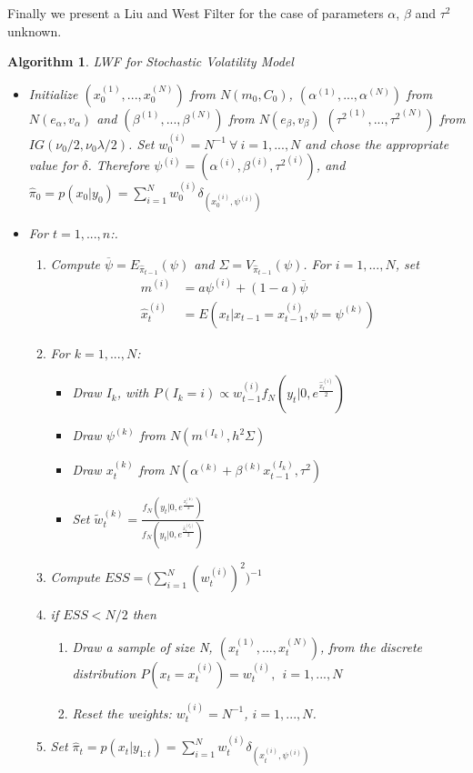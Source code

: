 \documentclass[
]{book}
\theoremstyle{break}
\theoremstyle{nonumberplain}
\newtheorem{algorithm}{Algorithm}[section]
\begin{document}
Finally we present a Liu and West Filter for the case of parameters
\(\alpha\), \(\beta\) and \(\tau^{2}\) unknown.

\begin{algorithm} LWF for Stochastic Volatility Model
\begin{itemize}
\item Initialize $(x_{0}^{(1)},...,x_{0}^{(N)})$ from $N(m_{0},C_{0})$, $(\alpha^{(1)},...,\alpha^{(N)})$ from $N(e_{\alpha},v_\alpha)$ and
$(\beta^{(1)},...,\beta^{(N)})$ from $N(e_{\beta},v_\beta)$ $({\tau^{2}}^{(1)},...,{\tau^{2}}^{(N)})$ from $IG(\nu_{0}/2,\nu_{0}\lambda/2)$. Set $w_{0}^{(i)}=N^{-1} \ \forall \ i=1,...,N$ and chose the appropriate value for $\delta$. Therefore $\psi^{(i)}=({\alpha}^{(i)},{\beta}^{(i)},{\tau^{2}}^{(i)})$, and
$\hat{\pi}_{0}=p(x_{0}|y_{0})=\sum_{i=1}^{N}w_{0}^{(i)}\delta_{(x_{0}^{(i)},\psi^{(i)})}$
\item For $t=1,...,n$:.
\begin{enumerate}
\item Compute $\overline{\psi}=E_{\hat{\pi}_{t-1}}(\psi)$ and $\Sigma=V_{\hat{\pi}_{t-1}}(\psi)$. For $i=1,...,N$, set
\begin{align*}
m^{(i)} & = a\psi^{(i)}+(1-a)\overline{\psi} \\
\hat{x}_{t}^{(i)} & = E(x_{t}|x_{t-1}=x_{t-1}^{(i)},\psi=\psi^{(k)})
\end{align*}
\item For $k=1,...,N$:
\begin{itemize}
\item Draw $I_{k}$, with $P(I_{k}=i) \propto w_{t-1}^{(i)}f_{N}(y_{t}|0,e^{\frac{\hat{x}_{t}^{(i)}}{2}}) $
\item Draw $\psi^{(k)}$ from $N(m^{(I_{k})},h^{2}\Sigma)$
\item Draw $x_{t}^{(k)}$ from $N(\alpha^{(k)}+\beta^{(k)}x_{t-1}^{(I_{k})},\tau^{2})$
\item Set  $\tilde{w}_{t}^{(k)} = \frac{f_{N}(y_{t}|0,e^{\frac{x_{t}^{(k)}}{2}})}{f_{N}(y_{t}|0,e^{\frac{\hat{x}_{t}^{(I_{k})}}{2}})}$
\end{itemize}
\item Compute $ESS=\Bigg(\sum_{i=1}^{N}(w_{t}^{(i)})^{2}\Bigg)^{-1}$
\item if $ESS<N/2$ then
\begin{enumerate}
\item Draw a sample of size N, $(x_{t}^{(1)},...,x_{t}^{(N)})$, from the discrete distribution $P(x_{t}=x_{t}^{(i)})=w_{t}^{(i)},\ \ i=1,...,N$
\item Reset the weights: $w_{t}^{(i)}=N^{-1}$, $i=1,...,N$.
\end{enumerate}
\item Set $\hat{\pi}_{t}=p(x_{t}|y_{1:t})=\sum_{i=1}^{N}w_{t}^{(i)}\delta_{(x_{t}^{(i)},\psi^{(i)})}$
\end{enumerate}
\end{itemize}
\end{algorithm}
\end{document}
